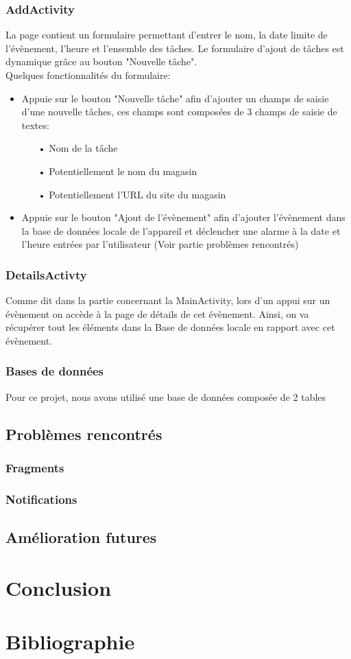 \documentclass[12pt,a4paper]{report}
\begin{document}
\subsection{AddActivity}
\begin{flushleft}
\justify
La page contient un formulaire permettant d'entrer le nom, la date limite de l'évènement, l'heure et l'ensemble des tâches. Le formulaire d'ajout de tâches est dynamique grâce au bouton "Nouvelle tâche".\\

Quelques fonctionnalités du formulaire:
\begin{itemize}
\item Appuie sur le bouton "Nouvelle tâche" afin d'ajouter un champs de saisie d'une nouvelle tâches, ces champs sont composées de 3 champs de saisie de textes:
\begin{itemize}
\item[•] Nom de la tâche
\item[•] Potentiellement le nom du magasin
\item[•] Potentiellement l'URL du site du magasin
\end{itemize}
\item Appuie sur le bouton "Ajout de l'évènement" afin d'ajouter l'évènement dans la base de données locale de l'appareil et déclencher une alarme à la date et l'heure entrées par l'utilisateur (Voir partie problèmes rencontrés)
\end{itemize}
\end{flushleft}
\subsection{DetailsActivty}
\begin{flushleft}
\justify
Comme dit dans la partie concernant la MainActivity, lors d'un appui sur un évènement on accède à la page de détails de cet évènement. Ainsi, on va récupérer tout les éléments dans la Base de données locale en rapport avec cet évènement.
\end{flushleft}
\subsection{Bases de données}
\begin{flushleft}
\justify
Pour ce projet, nous avons utilisé une base de données composée de 2 tables
\end{flushleft}
\section{Problèmes rencontrés}
\subsection{Fragments}
\subsection{Notifications}
\section{Amélioration futures}
\newpage
\chapter{Conclusion}
\newpage
\chapter{Bibliographie}
\end{document}
